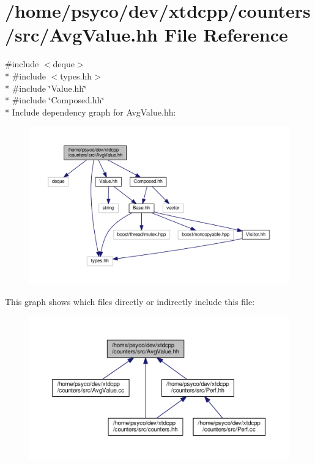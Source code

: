 \hypertarget{AvgValue_8hh}{}\section{/home/psyco/dev/xtdcpp/counters/src/\+Avg\+Value.hh File Reference}
\label{AvgValue_8hh}
{\ttfamily \#include $<$deque$>$}\\*
{\ttfamily \#include $<$types.\+hh$>$}\\*
{\ttfamily \#include \char`\"{}Value.\+hh\char`\"{}}\\*
{\ttfamily \#include \char`\"{}Composed.\+hh\char`\"{}}\\*
Include dependency graph for Avg\+Value.\+hh\+:
\nopagebreak
\begin{figure}[H]
\begin{center}
\leavevmode
\includegraphics[width=350pt]{AvgValue_8hh__incl}
\end{center}
\end{figure}
This graph shows which files directly or indirectly include this file\+:
\nopagebreak
\begin{figure}[H]
\begin{center}
\leavevmode
\includegraphics[width=350pt]{AvgValue_8hh__dep__incl}
\end{center}
\end{figure}
